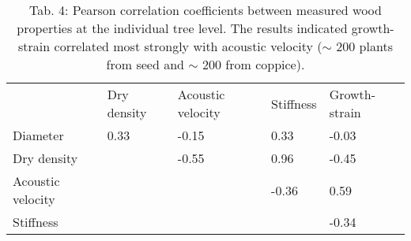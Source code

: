 \begin{table}
\centering
\caption{Tab. 4: Pearson correlation coefficients between measured wood properties at the individual tree level. The results indicated growth-strain correlated most strongly with acoustic velocity (\(\sim\) 200 plants from seed and \(\sim\) 200 from coppice). }
\begin{tabular}{lllll}
                  & Dry density & Acoustic velocity & Stiffness & Growth-strain \\
Diameter          & 0.33        & -0.15             & 0.33      & -0.03         \\
Dry density       &             & -0.55             & 0.96      & -0.45         \\
Acoustic velocity &             &                   & -0.36     & 0.59          \\
Stiffness         &             &                   &           & -0.34        
\end{tabular}
\end{table}